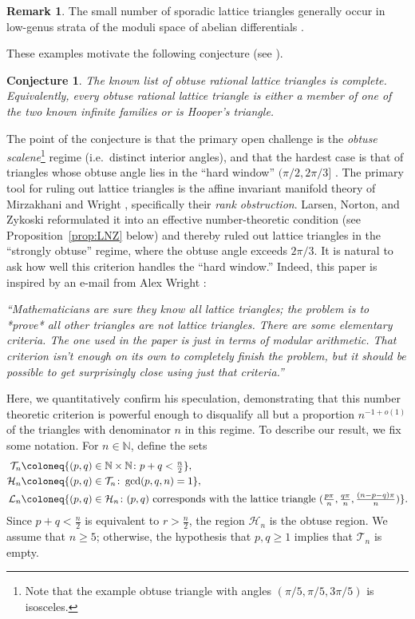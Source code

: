 \documentclass[12pt]{amsart}
\newtheorem*{conjecture}{Conjecture}
\theoremstyle{definition}
\newtheorem{remark}{Remark}
\begin{document}
\begin{remark}
The small number of sporadic lattice triangles generally occur in low-genus strata of the moduli space of abelian differentials \cite{McM, MW}.
\end{remark}

These examples motivate the following conjecture (see \cite{LNZ}).

\begin{conjecture}
The known list of obtuse rational lattice triangles is complete. Equivalently, every obtuse rational lattice triangle is either a member of one of the two known infinite families or is Hooper's triangle.
\end{conjecture}

The point of the conjecture is that the primary open challenge is the \emph{obtuse scalene}\footnote{Note that the example obtuse triangle with angles $(\pi/5, \pi/5, 3\pi/5)$ is isosceles.} regime (i.e.\ distinct interior angles), and that the hardest case is that of triangles whose obtuse angle lies in the ``hard window'' $(\pi/2, 2\pi/3]$ \cite{LNZ, MW}.  The primary tool for ruling out lattice triangles is the affine invariant manifold theory of Mirzakhani and Wright \cite{MW}, specifically their \emph{rank obstruction}.  Larsen, Norton, and Zykoski \cite{LNZ} reformulated it into an effective number-theoretic condition (see Proposition~\ref{prop:LNZ} below) and thereby ruled out lattice triangles in the ``strongly obtuse'' regime, where the obtuse angle exceeds $2\pi/3$.  It is natural to ask how well this criterion handles the ``hard window.'' Indeed, this paper is inspired by an e-mail from Alex Wright %
\cite{WrightEmail}:

\medskip
\noindent
{\it ``Mathematicians are sure they know all lattice triangles; the problem is to *prove* all other triangles are not lattice triangles. There are some elementary criteria. The one used in the paper \cite{LNZ} is just in terms of modular arithmetic. That criterion isn't enough on its own to completely finish the problem, but it should be possible to get surprisingly close using just that criteria.''}
\medskip

Here, we quantitatively confirm his speculation, demonstrating that this number theoretic criterion is powerful enough to disqualify all but a proportion $n^{-1+o(1)}$ of the triangles with denominator $n$ in this regime.  To describe our result, we fix some notation.  For $n\in\mathbb{N}$, define the sets
\[
\begin{aligned}
\mathcal{T}_n&\coloneq \{(p,q)\in\mathbb{N}\times\mathbb{N}\colon p+q<\tfrac{n}{2}\},\\
\mathcal H_n &\coloneq \{(p,q)\in \mathcal{T}_n\colon \gcd(p,q,n)=1\},\\
\mathcal{L}_n&\coloneq \{(p,q)\in\mathcal{H}_n\colon \textup{$(p,q)$ corresponds with the lattice triangle $(\tfrac{p\pi}{n},\tfrac{q\pi}{n},\tfrac{(n-p-q)\pi}{n})$}\}.
\end{aligned}
\]
Since $p+q<\tfrac{n}{2}$ is equivalent to $r>\frac{n}{2}$, the region $\mathcal{H}_n$ is the obtuse region.  We assume that $n\geq 5$; otherwise, the hypothesis that $p,q\geq 1$ implies that $\mathcal{T}_n$ is empty.
\end{document}
